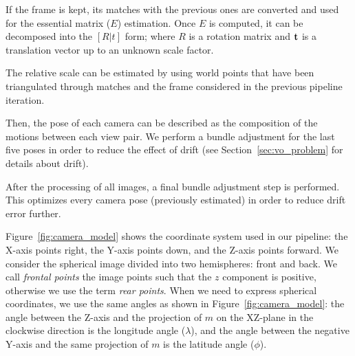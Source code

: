 If the frame is kept, its matches with the previous ones are converted
and used for the essential matrix ($E$) estimation. Once $E$ is computed, 
it can be decomposed into the \([R|t]\) form; where $R$ is a rotation matrix 
and $\mathbf{t}$ is a translation vector up to an unknown scale factor.

The relative scale can be estimated by using world points that have been 
triangulated through matches and the frame considered in the previous pipeline 
iteration.

Then, the pose of each camera can be described as the composition of the 
motions between each view pair. We perform a bundle adjustment for the last five 
poses in order to reduce the effect of drift (see Section~\ref{sec:vo_problem}
for details about drift).

After the processing of all images, a final bundle adjustment step is performed. 
This optimizes every camera pose (previously estimated) in order to reduce drift error further.

Figure~\ref{fig:camera_model} shows the coordinate system used in our pipeline: the X-axis points right, the Y-axis points down, and the Z-axis points forward. We consider the spherical image divided into two hemispheres: front and back. We call \textit{frontal points} the image points such that the $z$ component is positive, otherwise we use the term \textit{rear points}.
When we need to express spherical coordinates, we use the same angles as shown in 
Figure~\ref{fig:camera_model}:
the angle between the Z-axis and the projection of $m$ on the XZ-plane in 
the clockwise direction is the longitude angle ($\lambda$), and the angle 
between the negative Y-axis and the same projection of $m$ is the latitude 
angle ($\phi$).

